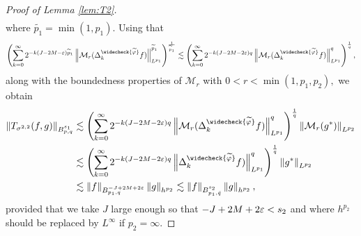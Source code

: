 \begin{proof}[Proof of Lemma \ref{lem:T2}]
\begin{align*}
\end{align*}
where $\widetilde{p_1}=\min(1,p_1).$ Using that
$$
\left(\sum\limits_{k=0}^\infty 2^{-k (J-2M-\eps)\widetilde{p}_1} \norm{\mathcal{M}_r(\Delta^{\widecheck{\widetilde{\f}}}_k f)}{L^{p_1}}^{\widetilde{p}_1} \right)^{\frac{1}{\widetilde{p}_1}}\lesssim \left( \sum\limits_{k=0}^\infty 2^{-k  (J-2M -2\eps)q} \norm{\mathcal{M}_r(\Delta^{\widecheck{\widetilde{\f}}}_k f)}{L^{p_1}}^q  \right)^\frac{1}{q},
$$
along with  the boundedness properties of $\mathcal{M}_r$ with $0<r<\min(1,p_1,p_2),$ we obtain
\begin{align*}
\norm{T_{\sigma^{2,2}}(f,g)}{\ibes{p}{s_1}{q}} & \lesssim \left( \sum\limits_{k=0}^\infty 2^{-k  (J-2M -2\eps)q} \norm{\mathcal{M}_r(\Delta^{\widecheck{\widetilde{\f}}}_k f)}{L^{p_1}}^q  \right)^\frac{1}{q}\norm{\mathcal{M}_r(g^*)}{L^{p_2}}\\
& \lesssim \left( \sum\limits_{k=0}^\infty 2^{-k  (J-2M -2\eps)q} \norm{\Delta^{\widecheck{\widetilde{\f}}}_k f)}{L^{p_1}}^q  \right)^\frac{1}{q} \norm{g^*}{L^{p_2}}\\
& \lesssim \norm{f}{\ibes{p_1}{-J +2M +2\eps}{q}} \norm{g}{h^{p_2}} \lesssim  \norm{f}{\ibes{p_1}{s_2}{\bar{q}}} \norm{g}{h^{p_2}},
\end{align*}
provided that we take $J$ large enough so that $-J +2M +2\varepsilon < s_2$ and where $h^{p_2}$ should be replaced by $L^\infty$ if $p_2=\infty.$
\end{proof}

